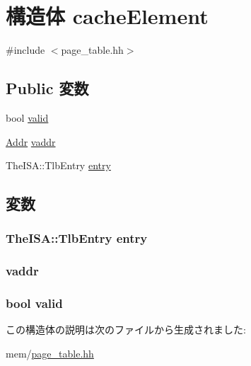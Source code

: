 \hypertarget{structPageTable_1_1cacheElement}{
\section{構造体 cacheElement}
\label{structPageTable_1_1cacheElement}
}


{\ttfamily \#include $<$page\_\-table.hh$>$}\subsection*{Public 変数}
\begin{DoxyCompactItemize}
\item 
bool \hyperlink{structPageTable_1_1cacheElement_a28e3c179a86f337095088b3ca02a2b2a}{valid}
\item 
\hyperlink{base_2types_8hh_af1bb03d6a4ee096394a6749f0a169232}{Addr} \hyperlink{structPageTable_1_1cacheElement_a9f933b300ef63eea367ca82f8da31025}{vaddr}
\item 
TheISA::TlbEntry \hyperlink{structPageTable_1_1cacheElement_ad4a78f29e7f4b676825756c275a61918}{entry}
\end{DoxyCompactItemize}


\subsection{変数}
\hypertarget{structPageTable_1_1cacheElement_ad4a78f29e7f4b676825756c275a61918}{
\subsubsection[{entry}]{\setlength{\rightskip}{0pt plus 5cm}TheISA::TlbEntry {\bf entry}}}
\label{structPageTable_1_1cacheElement_ad4a78f29e7f4b676825756c275a61918}
\hypertarget{structPageTable_1_1cacheElement_a9f933b300ef63eea367ca82f8da31025}{
\subsubsection[{vaddr}]{ {\bf vaddr}}}
\label{structPageTable_1_1cacheElement_a9f933b300ef63eea367ca82f8da31025}
\hypertarget{structPageTable_1_1cacheElement_a28e3c179a86f337095088b3ca02a2b2a}{
\subsubsection[{valid}]{\setlength{\rightskip}{0pt plus 5cm}bool {\bf valid}}}
\label{structPageTable_1_1cacheElement_a28e3c179a86f337095088b3ca02a2b2a}


この構造体の説明は次のファイルから生成されました:\begin{DoxyCompactItemize}
\item 
mem/\hyperlink{page__table_8hh}{page\_\-table.hh}\end{DoxyCompactItemize}

